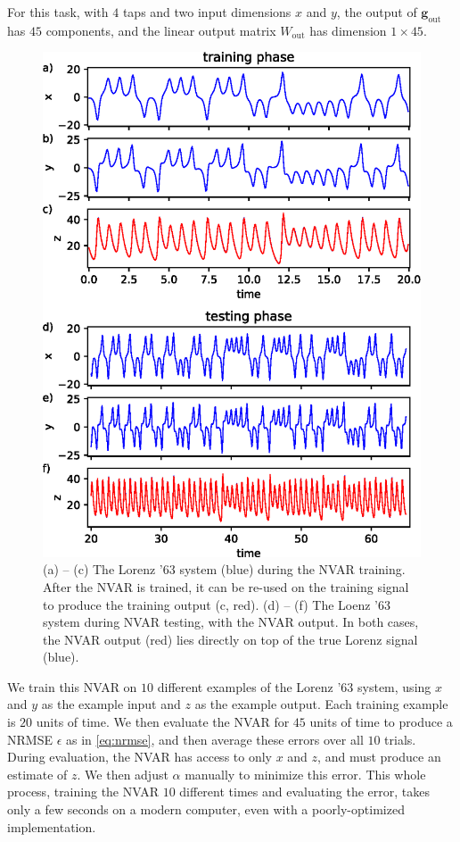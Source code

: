 For this task, with $4$ taps and two input dimensions $x$ and $y$, the
output of $\bm{g}_\text{out}$ has $45$ components, and the linear
output matrix $W_\text{out}$ has dimension $1 \times 45$.

\begin{figure}
  \includegraphics{figures/nvar-infer-lorenz}
  \caption{(a) -- (c) The Lorenz '63 system (blue) during the NVAR
    training. After the NVAR is trained, it can be re-used on the
    training signal to produce the training output (c, red). (d) --
    (f) The Loenz '63 system during NVAR testing, with the NVAR
    output. In both cases, the NVAR output (red) lies directly on top
    of the true Lorenz signal (blue).}
  \label{fig:nvar-infer-lorenz}
\end{figure}

We train this NVAR on $10$ different examples of the Lorenz '63
system, using $x$ and $y$ as the example input and $z$ as the example
output. Each training example is $20$ units of time. We then evaluate
the NVAR for $45$ units of time to produce a NRMSE $\epsilon$ as in
\cref{eq:nrmse}, and then average these errors over all $10$
trials. During evaluation, the NVAR has access to only $x$ and $z$,
and must produce an estimate of $z$. We then adjust $\alpha$ manually
to minimize this error. This whole process, training the NVAR $10$
different times and evaluating the error, takes only a few seconds on
a modern computer, even with a poorly-optimized implementation.

